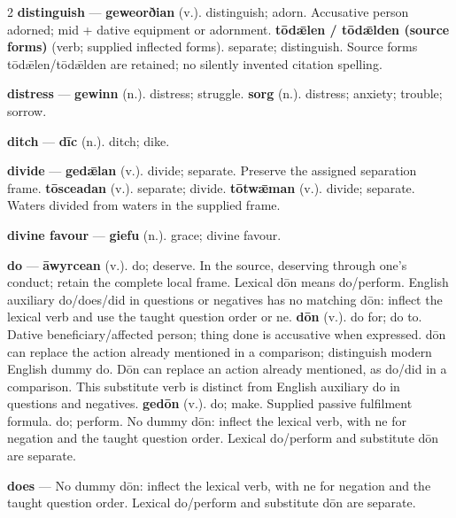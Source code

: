 \begin{multicols}{2}
\textbf{distinguish} — \textbf{geweorðian} (v.). distinguish; adorn. Accusative person adorned; mid + dative equipment or adornment. \textbf{tōdǣlen / tōdǣlden (source forms)} (verb; supplied inflected forms). separate; distinguish. Source forms tōdǣlen/tōdǣlden are retained; no silently invented citation spelling.\par
\textbf{distress} — \textbf{gewinn} (n.). distress; struggle. \textbf{sorg} (n.). distress; anxiety; trouble; sorrow.\par
\textbf{ditch} — \textbf{dīc} (n.). ditch; dike.\par
\textbf{divide} — \textbf{gedǣlan} (v.). divide; separate. Preserve the assigned separation frame. \textbf{tōsceadan} (v.). separate; divide. \textbf{tōtwǣman} (v.). divide; separate. Waters divided from waters in the supplied frame.\par
\textbf{divine favour} — \textbf{giefu} (n.). grace; divine favour.\par
\textbf{do} — \textbf{āwyrcean} (v.). do; deserve. In the source, deserving through one's conduct; retain the complete local frame. Lexical dōn means do/perform. English auxiliary do/does/did in questions or negatives has no matching dōn: inflect the lexical verb and use the taught question order or ne. \textbf{dōn} (v.). do for; do to. Dative beneficiary/affected person; thing done is accusative when expressed. dōn can replace the action already mentioned in a comparison; distinguish modern English dummy do. Dōn can replace an action already mentioned, as do/did in a comparison. This substitute verb is distinct from English auxiliary do in questions and negatives. \textbf{gedōn} (v.). do; make. Supplied passive fulfilment formula. do; perform. No dummy dōn: inflect the lexical verb, with ne for negation and the taught question order. Lexical do/perform and substitute dōn are separate.\par
\textbf{does} — No dummy dōn: inflect the lexical verb, with ne for negation and the taught question order. Lexical do/perform and substitute dōn are separate.\par

\end{multicols}
